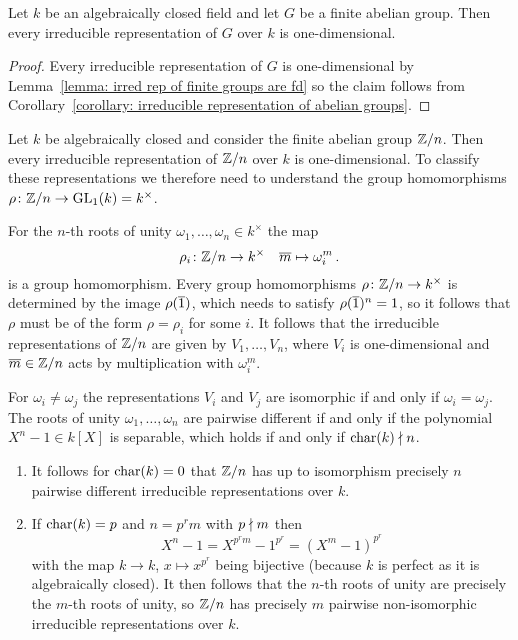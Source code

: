 \begin{corollary}
  Let $k$ be an algebraically closed field and let $G$ be a finite abelian group.
  Then every irreducible representation of $G$ over $k$ is one-dimensional.
\end{corollary}


\begin{proof}
  Every irreducible representation of $G$ is one-dimensional by Lemma~\ref{lemma: irred rep of finite groups are fd} so the claim follows from Corollary~\ref{corollary: irreducible representation of abelian groups}.
\end{proof}


\begin{example}
  \label{example: irreducible representations for Zn}
  Let $k$ be algebraically closed and consider the finite abelian group $\mathbb{Z}/n$.
  Then every irreducible representation of $\mathbb{Z}/n$ over $k$ is one-dimensional.
  To classify these representations we therefore need to understand the group homomorphisms $\rho \colon \mathbb{Z}/n \to \operatorname{GL}_1(k) = k^\times$.
  
  For the $n$-th roots of unity $\omega_1, \dotsc, \omega_n \in k^\times$ the map
  \[
            \rho_i
    \colon  \mathbb{Z}/n
    \to     k^\times
    \quad   \overline{m}
    \mapsto \omega_i^m \,.
  \]
  is a group homomorphism.
  Every group homomorphisms $\rho \colon \mathbb{Z}/n \to k^\times$ is determined by the image $\rho(\overline{1})$, which needs to satisfy $\rho(\overline{1})^n = 1$, so it follows that $\rho$ must be of the form $\rho = \rho_i$ for some $i$.
  It follows that the irreducible representations of $\mathbb{Z}/n$ are given by $V_1, \dotsc, V_n$, where $V_i$ is one-dimensional and $\overline{m} \in \mathbb{Z}/n$ acts by multiplication with $\omega_i^m$.
  
  For $\omega_i \neq \omega_j$ the representations $V_i$ and $V_j$ are isomorphic if and only if $\omega_i = \omega_j$.
  The roots of unity $\omega_1, \dotsc, \omega_n$ are pairwise different if and only if the polynomial $X^n - 1 \in k[X]$ is separable, which holds if and only if $\operatorname{char}(k) \nmid n$.
  \begin{enumerate}
    \item
      It follows for $\operatorname{char}(k) = 0$ that $\mathbb{Z}/n$ has up to isomorphism precisely $n$ pairwise different irreducible representations over $k$.
    \item
      If $\operatorname{char}(k) = p$ and $n = p^r m$ with $p \nmid m$ then
      \[
          X^n - 1
        = X^{p^r m} - 1^{p^r}
        = (X^m - 1)^{p^r}
      \]
      with the map $k \to k$, $x \mapsto x^{p^r}$ being bijective (because $k$ is perfect as it is algebraically closed).
      It then follows that the $n$-th roots of unity are precisely the $m$-th roots of unity, so $\mathbb{Z}/n$ has precisely $m$ pairwise non-isomorphic irreducible representations over $k$.
  \end{enumerate}
\end{example}


